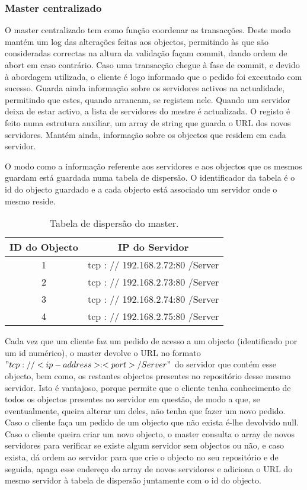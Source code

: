 \subsubsection{Master centralizado}

O master centralizado tem como função coordenar as transacções. Deste modo mantém um log das alterações feitas aos objectos, permitindo às que são consideradas correctas na altura da validação façam commit, dando ordem de abort em caso contrário. Caso uma transacção chegue à fase de commit, e devido à abordagem utilizada, o cliente é logo informado que o pedido foi executado com sucesso. Guarda ainda informação sobre os servidores activos na actualidade, permitindo que estes, quando arrancam, se registem nele. Quando um servidor deixa de estar activo, a lista de servidores do mestre é actualizada. O registo é feito numa estrutura auxiliar, um array de string que guarda o URL dos novos servidores. Mantém ainda, informação sobre os objectos que residem em cada servidor.

O modo como a informação referente aos servidores e aos objectos que os mesmos guardam está guardada numa tabela de dispersão. O identificador da tabela é o id do objecto guardado e a cada objecto está associado um servidor onde o mesmo reside.

\begin{table}
\centering
\begin{tabular}{c|c}
ID do Objecto & IP do Servidor \\\hline
1 & tcp : // 192.168.2.72:80 /Server \\
2 & tcp : // 192.168.2.73:80 /Server \\
3 & tcp : // 192.168.2.74:80 /Server \\
4 & tcp : // 192.168.2.75:80 /Server \\
\end{tabular}
\caption{\label{tab:widgets}Tabela de dispersão do master.}
\end{table}

Cada vez que um cliente faz um pedido de acesso a um objecto (identificado por um id numérico), o master devolve o URL no formato \("tcp : // <ip-address>:<port> /Server"\) do servidor que contém esse objecto, bem como, os restantes objectos presentes no repositório desse mesmo servidor.  Isto é vantajoso, porque permite que o cliente tenha conhecimento de todos os objectos presentes no servidor em questão, de modo a que, se eventualmente, queira alterar um deles, não tenha que fazer um novo pedido. Caso o cliente faça um pedido de um objecto que não exista é-lhe devolvido null. Caso o cliente queira criar um novo objecto, o master consulta o array de novos servidores para verificar se existe algum servidor sem objectos ou não, e caso exista, dá ordem ao servidor para que crie o objecto no seu repositório e de seguida, apaga esse endereço do array de novos servidores e adiciona o URL do mesmo servidor à tabela de dispersão juntamente com o id do objecto. 